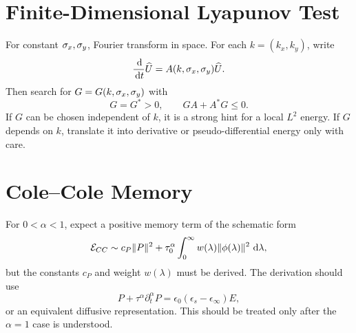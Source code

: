 \documentclass[UTF8,a4paper,12pt]{ctexart}
\begin{document}
\section{Finite-Dimensional Lyapunov Test}

For constant \(\sigma_x,\sigma_y\), Fourier transform in space.  For each \(k=(k_x,k_y)\), write
\[
  \frac{\,\mathrm{d}}{\,\mathrm{d} t}\widehat U=A(k,\sigma_x,\sigma_y)\widehat U.
\]
Then search for \(G=G(k,\sigma_x,\sigma_y)\) with
\[
  G=G^*>0,\qquad GA+A^*G\le0.
\]
If \(G\) can be chosen independent of \(k\), it is a strong hint for a local \(L^2\) energy.  If \(G\) depends on \(k\), translate it into derivative or pseudo-differential energy only with care.

\section{Cole--Cole Memory}

For \(0<\alpha<1\), expect a positive memory term of the schematic form
\[
  \mathcal{E}_{CC}\sim c_P\|P\|^2+
  \tau_0^\alpha\int_0^\infty w(\lambda)\|\phi(\lambda)\|^2\,\,\mathrm{d}\lambda,
\]
but the constants \(c_P\) and weight \(w(\lambda)\) must be derived.  The derivation should use
\[
  P+\tau^\alpha\partial_t^\alpha P
  =\epsilon_0(\epsilon_s-\epsilon_\infty)E,
\]
or an equivalent diffusive representation.  This should be treated only after the \(\alpha=1\) case is understood.
\end{document}
